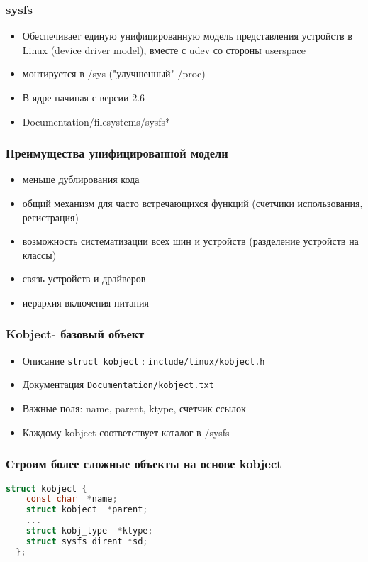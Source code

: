 \begin{frame}
  \frametitle{sysfs}
  \begin{itemize}
    \item Обеспечивает единую унифицированную модель представления устройств в Linux (device driver model), вместе с udev со стороны userspace
    \item монтируется в /sys ("улучшенный" /proc)
    \item В ядре начиная с версии 2.6
    \item Documentation/filesystems/sysfs*
  \end{itemize}
\end{frame}


\begin{frame}
  \frametitle{Преимущества унифицированной модели}
  \begin{itemize}
      \item меньше дублирования кода 
      \item общий механизм для часто встречающихся функций (счетчики использования, регистрация)
      \item возможность систематизации всех шин и устройств (разделение устройств на классы)
      \item связь устройств и драйверов
      \item иерархия включения питания
  \end{itemize}
\end{frame}

\begin{frame}
  \frametitle{Kobject- базовый объект}
  \begin{itemize}
    \item Описание \texttt{struct kobject} : \texttt{include/linux/kobject.h}
    \item Документация \texttt{Documentation/kobject.txt}
    \item Важные поля: name, parent, ktype, счетчик ссылок 
    \item Каждому kobject соответствует каталог в /sysfs
  \end{itemize}
\end{frame}

\begin{frame}[fragile]
  \frametitle{Строим более сложные объекты на основе kobject}
  \begin{lstlisting}[language=C]
  struct kobject { 
    const char  *name;
    struct kobject  *parent;
    ...
    struct kobj_type  *ktype;
    struct sysfs_dirent *sd;
  };
  \end{lstlisting}
\end{frame}

